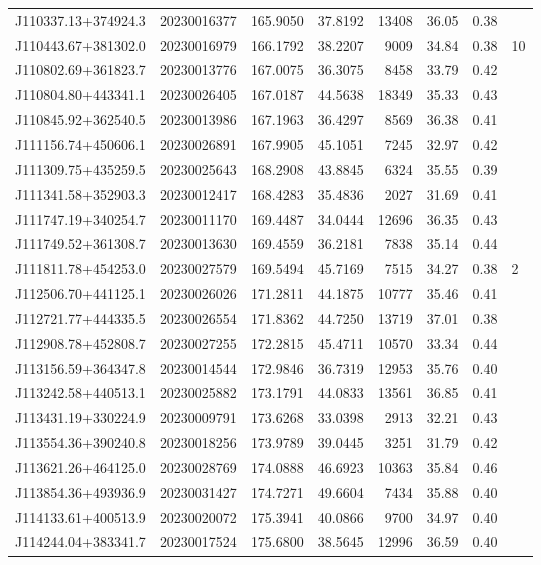 \documentclass{article}
\begin{document}
\begin {longtable}{|l|l|r|r|r|r|r|l|}
 J110337.13+374924.3&  20230016377&  165.9050&   37.8192& 13408& 36.05& 0.38&\\
 J110443.67+381302.0&  20230016979&  166.1792&   38.2207&  9009& 34.84& 0.38&10\\
 J110802.69+361823.7&  20230013776&  167.0075&   36.3075&  8458& 33.79& 0.42&\\
 J110804.80+443341.1&  20230026405&  167.0187&   44.5638& 18349& 35.33& 0.43&\\
 J110845.92+362540.5&  20230013986&  167.1963&   36.4297&  8569& 36.38& 0.41&\\
 J111156.74+450606.1&  20230026891&  167.9905&   45.1051&  7245& 32.97& 0.42&\\
 J111309.75+435259.5&  20230025643&  168.2908&   43.8845&  6324& 35.55& 0.39&\\
 J111341.58+352903.3&  20230012417&  168.4283&   35.4836&  2027& 31.69& 0.41&\\
 J111747.19+340254.7&  20230011170&  169.4487&   34.0444& 12696& 36.35& 0.43&\\
 J111749.52+361308.7&  20230013630&  169.4559&   36.2181&  7838& 35.14& 0.44&\\
 J111811.78+454253.0&  20230027579&  169.5494&   45.7169&  7515& 34.27& 0.38&2\\
 J112506.70+441125.1&  20230026026&  171.2811&   44.1875& 10777& 35.46& 0.41&\\
 J112721.77+444335.5&  20230026554&  171.8362&   44.7250& 13719& 37.01& 0.38&\\
 J112908.78+452808.7&  20230027255&  172.2815&   45.4711& 10570& 33.34& 0.44&\\
 J113156.59+364347.8&  20230014544&  172.9846&   36.7319& 12953& 35.76& 0.40&\\
 J113242.58+440513.1&  20230025882&  173.1791&   44.0833& 13561& 36.85& 0.41&\\
 J113431.19+330224.9&  20230009791&  173.6268&   33.0398&  2913& 32.21& 0.43&\\
 J113554.36+390240.8&  20230018256&  173.9789&   39.0445&  3251& 31.79& 0.42&\\
 J113621.26+464125.0&  20230028769&  174.0888&   46.6923& 10363& 35.84& 0.46&\\
 J113854.36+493936.9&  20230031427&  174.7271&   49.6604&  7434& 35.88& 0.40&\\
 J114133.61+400513.9&  20230020072&  175.3941&   40.0866&  9700& 34.97& 0.40&\\
 J114244.04+383341.7&  20230017524&  175.6800&   38.5645& 12996& 36.59& 0.40&\\

\end{longtable}
\end{document}

